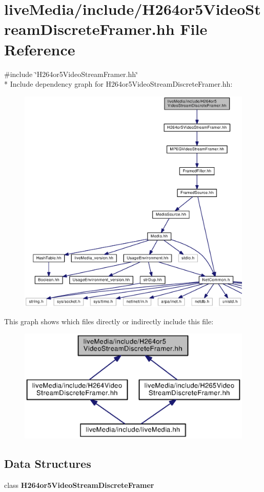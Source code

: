 \section{live\+Media/include/\+H264or5\+Video\+Stream\+Discrete\+Framer.hh File Reference}
\label{H264or5VideoStreamDiscreteFramer_8hh}
{\ttfamily \#include \char`\"{}H264or5\+Video\+Stream\+Framer.\+hh\char`\"{}}\\*
Include dependency graph for H264or5\+Video\+Stream\+Discrete\+Framer.\+hh\+:
\nopagebreak
\begin{figure}[H]
\begin{center}
\leavevmode
\includegraphics[width=350pt]{H264or5VideoStreamDiscreteFramer_8hh__incl}
\end{center}
\end{figure}
This graph shows which files directly or indirectly include this file\+:
\nopagebreak
\begin{figure}[H]
\begin{center}
\leavevmode
\includegraphics[width=350pt]{H264or5VideoStreamDiscreteFramer_8hh__dep__incl}
\end{center}
\end{figure}
\subsection*{Data Structures}
\begin{DoxyCompactItemize}
\item 
class {\bf H264or5\+Video\+Stream\+Discrete\+Framer}
\end{DoxyCompactItemize}
